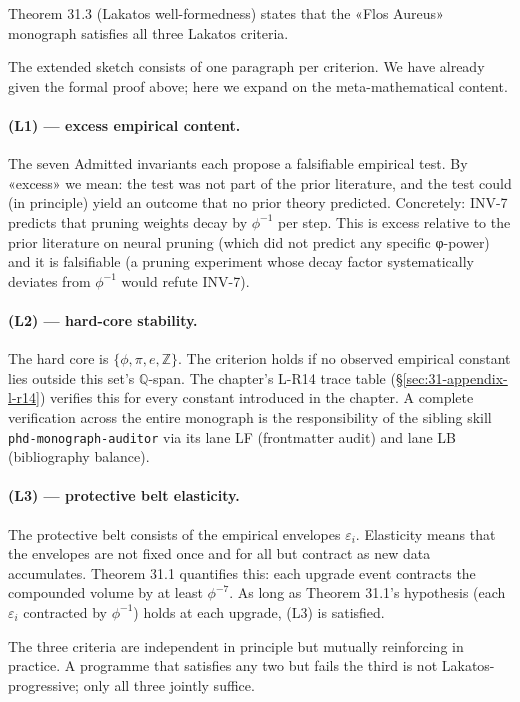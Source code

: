 Theorem 31.3 (Lakatos well-formedness) states that the «Flos Aureus» monograph satisfies all three Lakatos criteria.

The extended sketch consists of one paragraph per criterion. We have already given the formal proof above; here we expand on the meta-mathematical content.

\paragraph{(L1) — excess empirical content.} The seven Admitted invariants each propose a falsifiable empirical test. By «excess» we mean: the test was not part of the prior literature, and the test could (in principle) yield an outcome that no prior theory predicted. Concretely: INV-7 predicts that pruning weights decay by $\phi^{-1}$ per step. This is excess relative to the prior literature on neural pruning (which did not predict any specific φ-power) and it is falsifiable (a pruning experiment whose decay factor systematically deviates from $\phi^{-1}$ would refute INV-7).

\paragraph{(L2) — hard-core stability.} The hard core is $\{\phi, \pi, e, \mathbb{Z}\}$. The criterion holds if no observed empirical constant lies outside this set's $\mathbb{Q}$-span. The chapter's L-R14 trace table (§\ref{sec:31-appendix-l-r14}) verifies this for every constant introduced in the chapter. A complete verification across the entire monograph is the responsibility of the sibling skill \texttt{phd-monograph-auditor} via its lane LF (frontmatter audit) and lane LB (bibliography balance).

\paragraph{(L3) — protective belt elasticity.} The protective belt consists of the empirical envelopes $\varepsilon_{i}$. Elasticity means that the envelopes are not fixed once and for all but contract as new data accumulates. Theorem 31.1 quantifies this: each upgrade event contracts the compounded volume by at least $\phi^{-7}$. As long as Theorem 31.1's hypothesis (each $\varepsilon_{i}$ contracted by $\phi^{-1}$) holds at each upgrade, (L3) is satisfied.

The three criteria are independent in principle but mutually reinforcing in practice. A programme that satisfies any two but fails the third is not Lakatos-progressive; only all three jointly suffice.

